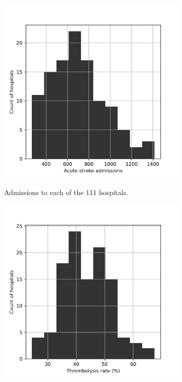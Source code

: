 \begin{figure}
    \centering
    \begin{subfigure}{.5\textwidth}
      \centering
      \captionsetup{width=.9\linewidth}
        {\includegraphics[width=0.95\linewidth]{./images/000_ssnap_descriptive_stats_admissions_hist}}\\
        \caption{Admissions to each of the 111 hospitals.}
        \label{fig:admission_rate}
        \end{subfigure}%
    \begin{subfigure}{.5\textwidth}
      \centering
      \captionsetup{width=.9\linewidth}
        {\includegraphics[width=0.95\linewidth]{./images/000_ssnap_descriptive_stats_thrombolysis_rate_hist}}\\

\end{subfigure}
\end{figure}
